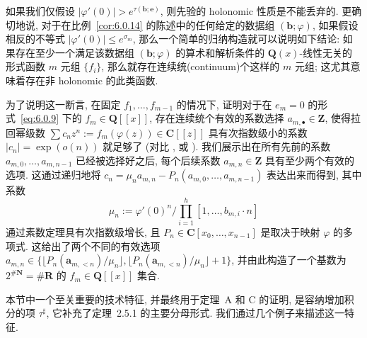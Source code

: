 \begin{remark}\label{rem:6.0.16}
如果我们仅假设 $|\varphi'(0)| > e^{\tau(\mathbf{b};\mathbf{e})}$, 则先验的 holonomic 性质是不能丢弃的.
更确切地说, 对于在比例~\ref{cor:6.0.14} 的陈述中的任何给定的数据组 $(\mathbf{b};\varphi)$, 如果假设相反的不等式 $|\varphi'(0)| \le e^{\sigma_m}$, 那么一个简单的归纳构造就可以说明如下结论: 如果存在至少一个满足该数据组 $(\mathbf{b};\varphi)$ 的算术和解析条件的 $\mathbf{Q}(x)$-线性无关的形式函数 $m$ 元组 $\{f_i\}$, 那么就存在连续统(continuum)个这样的 $m$ 元组; 这尤其意味着存在非 holonomic 的此类函数.

为了说明这一断言, 在固定 $f_1, \ldots, f_{m-1}$ 的情况下, 证明对于在 $e_m = 0$ 的形式~\eqref{eq:6.0.9} 下的 $f_m \in \mathbf{Q}[\![x]\!]$, 存在连续统个有效的系数选择 $a_{m,\bullet} \in \mathbf{Z}$, 使得拉回幂级数 $\sum c_n z^n := f_m(\varphi(z)) \in \mathbf{C}[\![z]\!]$ 具有次指数级小的系数 $|c_n| = \exp(o(n))$ 就足够了 (对比 \cite[§ 6.4.2]{BC22}, \cite[§ 6]{Pol1923} 或 \cite[§ 5]{Rob68}).
我们展示出在所有先前的系数 $a_{m,0}, \ldots, a_{m,n-1}$ 已经被选择好之后, 每个后续系数 $a_{m,n} \in \mathbf{Z}$ 具有至少两个有效的选项.
这通过递归地将 $c_n = \mu_n a_{m,n} - P_n(a_{m,0}, \ldots, a_{m,n-1})$ 表达出来而得到, 其中系数
\[ \mu_n := \varphi'(0)^n / \prod_{i=1}^h [1, \dots, b_{m,i} \cdot n] \]
通过素数定理具有次指数级增长, 且 $P_n \in \mathbf{C}[x_0, \dots, x_{n-1}]$ 是取决于映射 $\varphi$ 的多项式.
这给出了两个不同的有效选项 $a_{m,n} \in \{\lfloor P_n(\mathbf{a}_{m,< n})/\mu_n \rfloor, \lfloor P_n(\mathbf{a}_{m,< n})/\mu_n \rfloor + 1\}$, 并由此构造了一个基数为 $2^{\#\mathbf{N}} = \#\mathbf{R}$ 的 $f_m \in \mathbf{Q}[\![x]\!]$ 集合.
\end{remark}

本节中一个至关重要的技术特征, 并最终用于定理~A 和 C 的证明, 是容纳增加积分的项 $\tau^{\sharp}$, 它补充了定理~2.5.1 的主要分母形式.
我们通过几个例子来描述这一特征.

